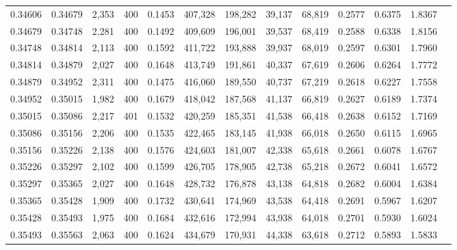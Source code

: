 \begin{tabular}{rrrrrrrrrrrrr}
0.34606 & 0.34679 &  2,353 & 400 &                                     0.1453 & 407,328 & 198,282 &  39,137 &  68,819 & 0.2577 & 0.6375 & 1.8367 \\
0.34679 & 0.34748 &  2,281 & 400 &                                     0.1492 & 409,609 & 196,001 &  39,537 &  68,419 & 0.2588 & 0.6338 & 1.8156 \\
0.34748 & 0.34814 &  2,113 & 400 &                                     0.1592 & 411,722 & 193,888 &  39,937 &  68,019 & 0.2597 & 0.6301 & 1.7960 \\
0.34814 & 0.34879 &  2,027 & 400 &                                     0.1648 & 413,749 & 191,861 &  40,337 &  67,619 & 0.2606 & 0.6264 & 1.7772 \\
0.34879 & 0.34952 &  2,311 & 400 &                                     0.1475 & 416,060 & 189,550 &  40,737 &  67,219 & 0.2618 & 0.6227 & 1.7558 \\
0.34952 & 0.35015 &  1,982 & 400 &                                     0.1679 & 418,042 & 187,568 &  41,137 &  66,819 & 0.2627 & 0.6189 & 1.7374 \\
0.35015 & 0.35086 &  2,217 & 401 &                                     0.1532 & 420,259 & 185,351 &  41,538 &  66,418 & 0.2638 & 0.6152 & 1.7169 \\
0.35086 & 0.35156 &  2,206 & 400 &                                     0.1535 & 422,465 & 183,145 &  41,938 &  66,018 & 0.2650 & 0.6115 & 1.6965 \\
0.35156 & 0.35226 &  2,138 & 400 &                                     0.1576 & 424,603 & 181,007 &  42,338 &  65,618 & 0.2661 & 0.6078 & 1.6767 \\
0.35226 & 0.35297 &  2,102 & 400 &                                     0.1599 & 426,705 & 178,905 &  42,738 &  65,218 & 0.2672 & 0.6041 & 1.6572 \\
0.35297 & 0.35365 &  2,027 & 400 &                                     0.1648 & 428,732 & 176,878 &  43,138 &  64,818 & 0.2682 & 0.6004 & 1.6384 \\
0.35365 & 0.35428 &  1,909 & 400 &                                     0.1732 & 430,641 & 174,969 &  43,538 &  64,418 & 0.2691 & 0.5967 & 1.6207 \\
0.35428 & 0.35493 &  1,975 & 400 &                                     0.1684 & 432,616 & 172,994 &  43,938 &  64,018 & 0.2701 & 0.5930 & 1.6024 \\
0.35493 & 0.35563 &  2,063 & 400 &                                     0.1624 & 434,679 & 170,931 &  44,338 &  63,618 & 0.2712 & 0.5893 & 1.5833 \\

\end{tabular}
